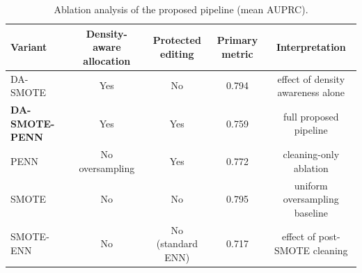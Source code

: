 \begin{table}[htb]
\centering
\caption{Ablation analysis of the proposed pipeline (mean AUPRC).}
\label{tab:ablation}
\small
\begin{tabular}{lcccc}
\toprule
Variant & Density-aware allocation & Protected editing & Primary metric & Interpretation
\\
\midrule
DA-SMOTE & Yes & No & 0.794 & effect of density awareness alone
\\
\textbf{DA-SMOTE-PENN} & Yes & Yes & 0.759 & full proposed pipeline
\\
PENN & No oversampling & Yes & 0.772 & cleaning-only ablation
\\
SMOTE & No & No & 0.795 & uniform oversampling baseline
\\
SMOTE-ENN & No & No (standard ENN) & 0.717 & effect of post-SMOTE cleaning
\\
\bottomrule
\end{tabular}
\end{table}
